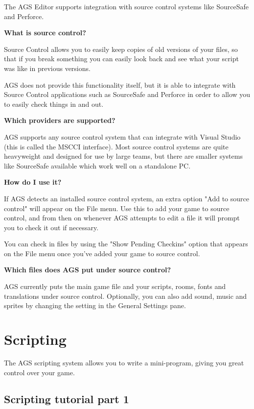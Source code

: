 The AGS Editor supports integration with source control systems like SourceSafe and Perforce.

\bf{What is source control?}

Source Control allows you to easily keep copies of old versions of your files, so that
if you break something you can easily look back and see what your script was like
in previous versions.

AGS does not provide this functionality itself, but it is able to integrate with
Source Control applications such as SourceSafe and Perforce in order to allow you
to easily check things in and out.

\bf{Which providers are supported?}

AGS supports any source control system that can integrate with Visual Studio
(this is called the MSCCI interface). Most source control systems are quite
heavyweight and designed for use by large teams, but there are smaller
systems like SourceSafe available which work well on a standalone PC.

\bf{How do I use it?}

If AGS detects an installed source control system, an extra option "Add to
source control" will appear on the File menu. Use this to add your game to
source control, and from then on whenever AGS attempts to edit a file it
will prompt you to check it out if necessary.

You can check in files by using the "Show Pending Checkins" option that
appears on the File menu once you've added your game to source control.

\bf{Which files does AGS put under source control?}

AGS currently puts the main game file and your scripts, rooms, fonts and
translations under source control. Optionally, you can also add sound, music
and sprites by changing the setting in the General Settings pane.


\chapter{Scripting}%

The AGS scripting system allows you to write a mini-program, giving you great
control over your game.

\section{Scripting tutorial part 1}%

